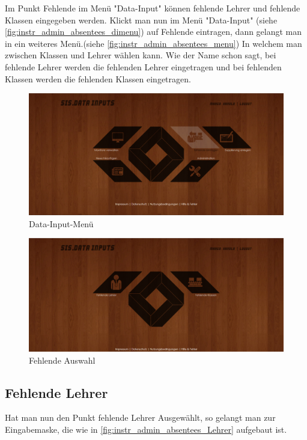 Im Punkt Fehlende im Menü "Data-Input" können fehlende Lehrer und fehlende Klassen eingegeben werden. Klickt man nun im Menü "Data-Input" (siehe \autoref{fig:instr_admin_absentees_dimenu}) auf Fehlende eintragen, dann gelangt man in ein weiteres Menü.(siehe \autoref{fig:instr_admin_absentees_menu}) In welchem man zwischen Klassen und Lehrer wählen kann. Wie der Name schon sagt, bei fehlende Lehrer werden die fehlenden Lehrer eingetragen und bei fehlenden Klassen werden die fehlenden Klassen eingetragen.
\begin{figure}[H]
\centering
\includegraphics[keepaspectratio=true, width=14cm]{images/screenshots/data-inputs2.png}
\caption{Data-Input-Menü}
\label{fig:instr_admin_absentees_dimenu}
\end{figure}
\begin{figure}[H]
\centering
\includegraphics[keepaspectratio=true, width=14cm]{images/screenshots/data-inputs_absentees.png}
\caption{Fehlende Auswahl}
\label{fig:instr_admin_absentees_menu}
\end{figure}
\subsection{Fehlende Lehrer}
Hat man nun den Punkt fehlende Lehrer Ausgewählt, so gelangt man zur Eingabemaske, die wie in \autoref{fig:instr_admin_absentees_Lehrer} aufgebaut ist.
